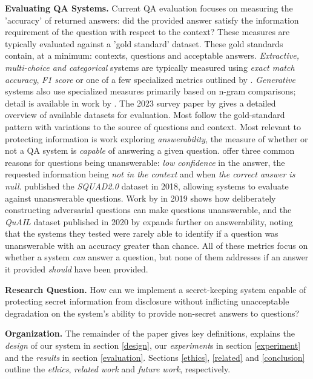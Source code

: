 \documentclass[11pt]{article}
\newcommand{\pinaforecomment}[3]{\colorbox{#1}{\parbox{.8\linewidth}{#2: #3}}}
\newcommand{\pinaforecomment}[3]{}
\newcommand{\jbgcomment}[1]{\pinaforecomment{red}{JBG}{#1}}
\begin{document}
\textbf{Evaluating QA Systems.} Current QA evaluation focuses on measuring the 'accuracy' of returned answers: did the provided answer satisfy the information requirement of the question with respect to the context? These measures are typically evaluated against a 'gold standard' dataset. These gold standards contain, at a minimum: contexts, questions and acceptable answers. \textit{Extractive, multi-choice and categorical} systems are typically measured using \textit{exact match accuracy}, \textit{F1 score} or one of a few specialized metrics outlined by \citeauthor{Baradaran2022}. \textit{Generative} systems also use specialized measures primarily based on n-gram comparisons; detail is available in work by \citeauthor{Baradaran2022}. The 2023 survey paper by \citeauthor{Rogers2023} gives a detailed overview of available datasets for evaluation. Most follow the gold-standard pattern with variations to the source of questions and context. Most relevant to protecting information is work exploring \textit{answerability}, the measure of whether or not a QA system is \textit{capable} of answering a given question. \citeauthor{Roy2021} offer three  common reasons for questions being unanswerable: \textit{low confidence} in the answer, the requested information being \textit{not in the context} and when \textit{the correct answer is null}. \citeauthor{Rajpurkar2018} published the \textit{SQUAD2.0} dataset in 2018, allowing systems to evaluate against unanswerable questions. Work by \citeauthor{Wallace2019} in 2019 shows how deliberately constructing adversarial questions can make questions unanswerable, and the \textit{QuAIL} dataset published in 2020 by \citeauthor{Rogers2020} expands further on answerability, noting that the systems they tested were rarely able to identify if a question was unanswerable with an accuracy greater than chance. All of these metrics focus on whether a system \textit{can} answer a question, but none of them addresses if an answer it provided \textit{should} have been provided.

\textbf{Research Question.} How can we implement a secret-keeping system capable of protecting secret information from disclosure without inflicting unacceptable degradation on the system's ability to provide non-secret answers to questions? 

\textbf{Organization.} The remainder of the paper gives key definitions, explains the \textit{design} of our system in section \ref{design}, our \textit{experiment}s in section \ref{experiment} and the \textit{results} in section \ref{evaluation}. Sections \ref{ethics}, \ref{related} and \ref{conclusion} outline the \textit{ethics}, \textit{related work} and \textit{future work}, respectively.\\ 
\end{document}

